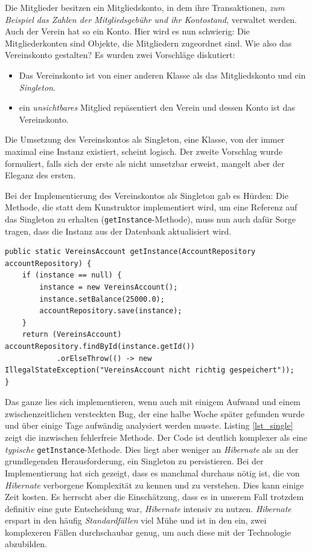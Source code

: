 \documentclass[a4paper, 11pt]{article}
\begin{document}
Die Mitglieder besitzen ein Mitgliedskonto, in dem ihre Transaktionen, \emph{zum
Beispiel das Zahlen der Mitgliedsgebühr und ihr Kontostand,} verwaltet werden.
Auch der Verein hat so ein Konto. Hier wird es nun schwierig: Die
Mitgliederkonten sind Objekte, die Mitgliedern zugeordnet sind. Wie also das
Vereinskonto gestalten? Es wurden zwei Vorschläge diskutiert:

\begin{itemize}
    \item Das Vereinskonto ist von einer anderen Klasse als das Mitgliedskonto
        und ein \emph{Singleton}.
    \item ein \emph{unsichtbares} Mitglied repäsentiert den Verein und dessen
        Konto ist das Vereinskonto.
\end{itemize}

Die Umsetzung des Vereinskontos als Singleton, eine Klasse, von der immer
maximal eine Instanz existiert, scheint logisch. Der zweite Vorschlag wurde
formuliert, falls sich der erste als nicht umsetzbar erweist, mangelt aber der
Eleganz des ersten.

Bei der Implementierung des Vereinskontos als Singleton gab es Hürden: Die
Methode, die statt dem Kunstruktor implementiert wird, um eine Referenz auf das
Singleton zu erhalten (\lstinline{getInstance}-Methode), muss nun auch dafür Sorge tragen, dass die Instanz aus
der Datenbank aktualisiert wird.

\begin{lstlisting}[caption=\texttt{getInstance}-Methode des Vereinskonto-Singletons, label=lst_single]
public static VereinsAccount getInstance(AccountRepository accountRepository) {
    if (instance == null) {
        instance = new VereinsAccount();
        instance.setBalance(25000.0);
        accountRepository.save(instance);
    }
    return (VereinsAccount) accountRepository.findById(instance.getId())
            .orElseThrow(() -> new IllegalStateException("VereinsAccount nicht richtig gespeichert"));
}
\end{lstlisting}

Das ganze lies sich implementieren, wenn auch mit einigem Aufwand und einem
zwischenzeitlichen versteckten Bug, der eine halbe Woche später gefunden wurde
und über einige Tage aufwändig analysiert werden musste. Listing
\ref{lst_single} zeigt die inzwischen fehlerfreie Methode. Der Code ist
deutlich komplexer als eine \emph{typische} \lstinline{getInstance}-Methode.
Dies liegt aber weniger an \emph{Hibernate} als an der grundlegenden Herausforderung,
ein Singleton zu persistieren. Bei der Implementierung hat sich gezeigt, dass
es manchmal durchaus nötig ist, die von \emph{Hibernate} verborgene Komplexität
zu kennen und zu verstehen. Dies kann einige Zeit kosten. Es herrscht aber die
Einschätzung, dass es in unserem Fall trotzdem definitiv eine gute Entscheidung
war, \emph{Hibernate} intensiv zu nutzen. \emph{Hibernate} erspart in den häufig
\emph{Standardfällen} viel Mühe und ist in den ein, zwei komplexeren Fällen
durchschaubar genug, um auch diese mit der Technologie abzubilden.
\end{document}
